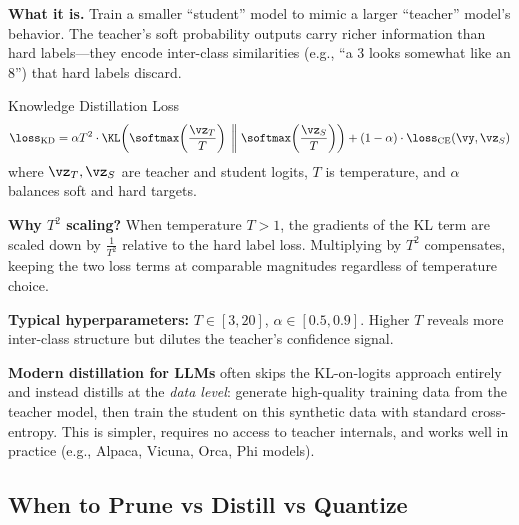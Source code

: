 \textbf{What it is.} Train a smaller ``student'' model to mimic a larger ``teacher'' model's behavior. The teacher's soft probability outputs carry richer information than hard labels---they encode inter-class similarities (e.g., ``a 3 looks somewhat like an 8'') that hard labels discard.

\begin{mathresult}{Knowledge Distillation Loss}
\begin{equation}
\loss_{\text{KD}} = \alpha T^2 \cdot \KL\!\left(\softmax\!\left(\frac{\vz_T}{T}\right) \;\bigg\|\; \softmax\!\left(\frac{\vz_S}{T}\right)\right) + (1 - \alpha) \cdot \loss_{\text{CE}}(\vy, \vz_S)
\end{equation}
where $\vz_T, \vz_S$ are teacher and student logits, $T$ is temperature, and $\alpha$ balances soft and hard targets.
\end{mathresult}

\textbf{Why $T^2$ scaling?} When temperature $T > 1$, the gradients of the KL term are scaled down by $\frac{1}{T^2}$ relative to the hard label loss. Multiplying by $T^2$ compensates, keeping the two loss terms at comparable magnitudes regardless of temperature choice.

\textbf{Typical hyperparameters:} $T \in [3, 20]$, $\alpha \in [0.5, 0.9]$. Higher $T$ reveals more inter-class structure but dilutes the teacher's confidence signal.

\textbf{Modern distillation for LLMs} often skips the KL-on-logits approach entirely and instead distills at the \textit{data level}: generate high-quality training data from the teacher model, then train the student on this synthetic data with standard cross-entropy. This is simpler, requires no access to teacher internals, and works well in practice (e.g., Alpaca, Vicuna, Orca, Phi models).

\subsection{When to Prune vs Distill vs Quantize}

